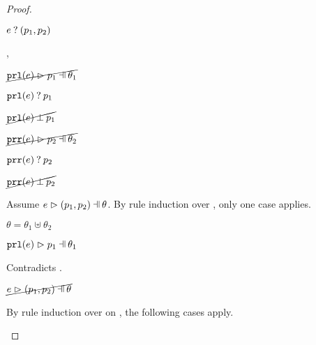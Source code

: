 \begin{proof}
\begin{byCases}
\begin{byCases}
\begin{byCases}
\begin{byCases}
\begin{pfsteps*}
                \item $e \mathbin{?} (p_1 , p_2)$ 
                \end{pfsteps*}
            \end{byCases}
        \item[\hmaymatch{\hprl{e}}{p_1},\hmaymatch{\hprr{e}}{p_2}]
            \begin{pfsteps*}
            \item $\cancel{\hpatmatch{\hprl{e}}{p_1}{\theta_1}}$  
            \item $\mathtt{prl}(e) \mathbin{?} p_1$  
            \item $\cancel{\mathtt{prl}(e) \mathbin{\bot} p_1}$  
            \item $\cancel{\hpatmatch{\hprr{e}}{p_2}{\theta_2}}$  
            \item $\mathtt{prr}(e) \mathbin{?} p_2$  
            \item $\cancel{\mathtt{prr}(e) \mathbin{\bot} p_2}$  
            \end{pfsteps*}
            Assume $\hpatmatch{e}{\hpair{p_1}{p_2}}{\theta}$. By rule induction over , only one case applies.
            \begin{byCases}
            \item[\text{(\ref{rule:MNotIntroPair})}]
                \begin{pfsteps*}
                \item $\theta=\theta_1\uplus\theta_2$ 
                \item $\hpatmatch{\hprl{e}}{p_1}{\theta_1}$  
                \end{pfsteps*}
                Contradicts .
            \end{byCases}
            \begin{pfsteps*}
            \item $\cancel{\hpatmatch{e}{\hpair{p_1}{p_2}}{\theta}}$ 
            \end{pfsteps*}
            By rule induction over  on , the following cases apply.

\end{byCases}
\end{byCases}
\end{byCases}
\end{proof}
